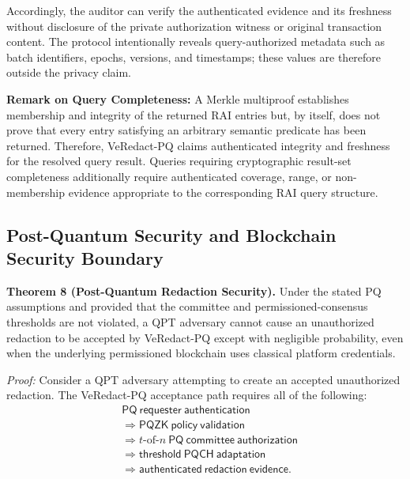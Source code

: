 \documentclass[lettersize,journal]{IEEEtran}
\begin{document}
    Accordingly, the auditor can verify the authenticated evidence and
    its freshness without disclosure of the private authorization witness
    or original transaction content. The protocol intentionally reveals
    query-authorized metadata such as batch identifiers, epochs, versions,
    and timestamps; these values are therefore outside the privacy claim.
     
    
    \noindent\textbf{Remark on Query Completeness:}
    A Merkle multiproof establishes membership and integrity of the
    returned RAI entries but, by itself, does not prove that every entry
    satisfying an arbitrary semantic predicate has been returned.
    Therefore, VeRedact-PQ claims authenticated integrity and freshness
    for the resolved query result. Queries requiring cryptographic
    result-set completeness additionally require authenticated coverage,
    range, or non-membership evidence appropriate to the corresponding
    RAI query structure.
    
    
    \subsection{Post-Quantum Security and Blockchain Security Boundary}
    
    \textbf{Theorem 8 (Post-Quantum Redaction Security).}
    Under the stated PQ assumptions and provided that the committee and
    permissioned-consensus thresholds are not violated, a QPT adversary
    cannot cause an unauthorized redaction to be accepted by
    VeRedact-PQ except with negligible probability, even when the
    underlying permissioned blockchain uses classical platform
    credentials.
    
    \emph{Proof:}
    Consider a QPT adversary attempting to create an accepted unauthorized
    redaction. The VeRedact-PQ acceptance path requires all of the
    following:
    \begin{equation}
    \begin{split}
    &\mathsf{PQ\ requester\ authentication}\\
    &\Rightarrow
    \mathsf{PQZK\ policy\ validation}\\
    &\Rightarrow
    t\text{-of-}n\ \mathsf{PQ\ committee\ authorization}\\
    &\Rightarrow
    \mathsf{threshold\ PQCH\ adaptation}\\
    &\Rightarrow
    \mathsf{authenticated\ redaction\ evidence}.
    \end{split}
    \label{eq:sec_pq_chain}
    \end{equation}
    
\end{document}
